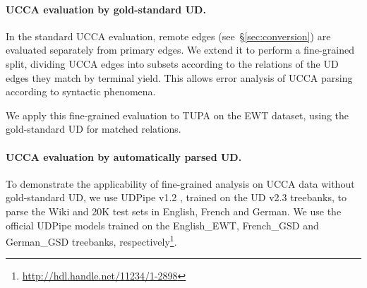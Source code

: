 \documentclass[11pt,a4paper]{article}
\begin{document}
\paragraph{UCCA evaluation by gold-standard UD.}

In the standard UCCA evaluation,
remote edges (see~\S\ref{sec:conversion}) are evaluated separately from primary edges.
We extend it to perform a fine-grained split,
dividing UCCA edges into subsets according to the relations of the UD edges
they match by terminal yield.
This allows error analysis of UCCA parsing according to syntactic phenomena.

We apply this fine-grained evaluation to TUPA on the EWT dataset,
using the gold-standard UD for matched relations.


\paragraph{UCCA evaluation by automatically parsed UD.}

To demonstrate the applicability of fine-grained analysis on UCCA data
without gold-standard UD,
we use UDPipe v1.2 \cite{udpipe,udpipe:2017}, trained on the UD v2.3 treebanks,
to parse the Wiki and 20K test sets in English, French and German.
We use the official UDPipe models trained on the English\_EWT, French\_GSD and German\_GSD
treebanks, respectively\footnote{\url{http://hdl.handle.net/11234/1-2898}}.


%

%
\end{document}
